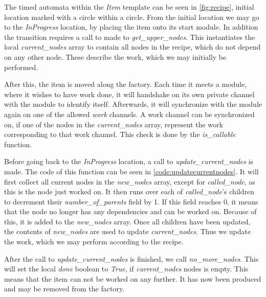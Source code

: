 

The timed automata within the \textit{Item} template can be seen in \cref{fig:recipe}, initial location marked with a circle within a circle. From the initial location we may go to the \textit{InProgress} location, by placing the item onto its start module. In addition the transition requires a call to made to \textit{get\_upper\_nodes}. This instantiates the local \emph{current\_nodes} array to contain all nodes in the recipe, which do not depend on any other node. These describe the work, which we may initially be performed.  

After this, the item is moved along the factory. Each time it meets a module, where it wishes to have work done, it will handshake on its own private channel with the module to identify itself. Afterwards, it will synchronize with the module again on one of the allowed \emph{work} channels. A work channel can be synchronized on, if one of the nodes in the \emph{current\_nodes} array, represent the work corresponding to that work channel. This check is done by the \emph{is\_callable} function.

Before going back to the \emph{InProgress} location, a call to \emph{update\_current\_nodes} is made. The code of this function can be seen in \cref{code:updatecurrentnodes}. It will first collect all current nodes in the \emph{new\_nodes} array, except for \emph{called\_node}, as this is the node just worked on. It then runs over each of \emph{called\_node}'s children to decrement their \emph{number\_of\_parents} field by 1. If this field reaches 0, it means that the node no longer has any dependencies and can be worked on. Because of this, it is added to the \emph{new\_nodes} array. Once all children have been updated, the contents of \emph{new\_nodes} are used to update \emph{current\_nodes}. Thus we update the work, which we may perform according to the recipe.  



After the call to \emph{update\_current\_nodes} is finished, we call \emph{no\_more\_nodes}. This will set the local \emph{done} boolean to \emph{True}, if \emph{current\_nodes} nodes is empty. This means that the item can not be worked on any further. It has now been produced and may be removed from the factory.

